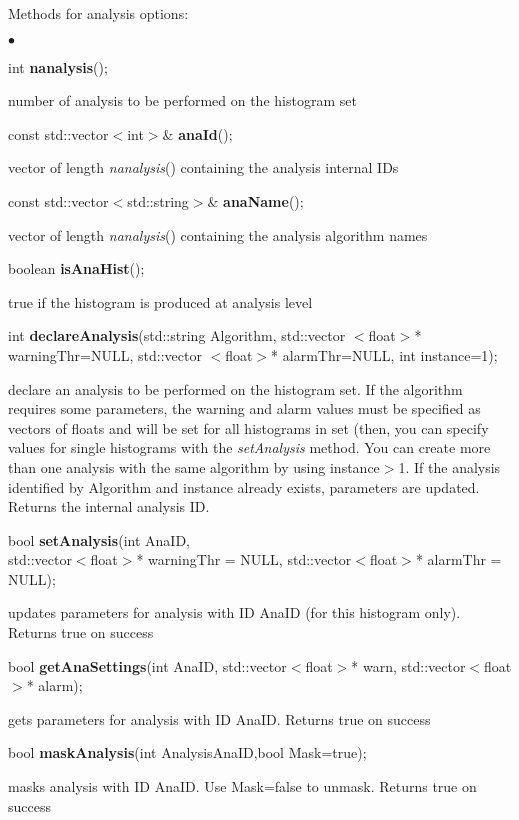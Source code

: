 \documentclass{lhcbnote}
\begin{document}
Methods for analysis options:
\begin{list}{$\bullet$}{}
\item   int {\bf  nanalysis}();

number of analysis to be performed on the histogram set
\item   const std::vector$<$int$>$\& {\bf anaId}();

vector of length {\it  nanalysis}() containing the analysis internal IDs
\item   const std::vector$<$std::string$>$\& {\bf anaName}();

vector of length {\it  nanalysis}() containing the analysis algorithm names
\item   boolean {\bf isAnaHist}();

true if the histogram is produced at analysis level
\item  int {\bf declareAnalysis}(std::string Algorithm, 
		      std::vector $<$float$>$* warningThr=NULL,  
		      std::vector $<$float$>$* alarmThr=NULL, 
		      int instance=1); 

declare an analysis to be performed on the histogram set. If the algorithm
requires some parameters, the warning and alarm values must be
specified as vectors of floats and will be set for all histograms in
set (then, you can specify values for single histograms with the {\it
setAnalysis} method. 
You can create more than one analysis
with the same algorithm by using instance$>$1. If the analysis
identified by Algorithm and instance already exists, parameters are
updated. Returns the internal analysis ID.

\item   bool {\bf setAnalysis}(int AnaID, \\
		   std::vector$<$float$>$* warningThr = NULL, 
		   std::vector$<$float$>$* alarmThr = NULL);

updates parameters for analysis with ID AnaID (for this histogram only). Returns true
on success
\item   bool {\bf getAnaSettings}(int AnaID,
		      std::vector$<$float$>$* warn, 
		      std::vector$<$float$>$* alarm); 

gets parameters for analysis with ID AnaID. Returns true
on success
\item   bool {\bf maskAnalysis}(int AnalysisAnaID,bool Mask=true); 

masks analysis with ID AnaID. Use Mask=false to unmask. Returns true
on success
\end{list}
\end{document}
